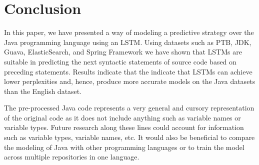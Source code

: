 \documentclass[runningheads,a4paper]{llncs}
\begin{document}

\section{Conclusion}

In this paper, we have presented a way of modeling a predictive strategy
over the Java programming language using an LSTM. Using datasets such as PTB,
JDK, Guava, ElasticSearch, and Spring Framework we have shown that
LSTMs are suitable in predicting the next syntactic statements of source
code based on preceding statements. Results indicate that the indicate
that LSTMs can achieve lower perplexities and, hence, produce more accurate models
on the Java datasets than the English dataset.

The pre-processed Java code represents a very general and cursory
representation of the original code as it does not include anything such
as variable names or variable types. Future research along these lines
could account for information such as variable types, variable names, etc.
It would also be beneficial to compare the modeling of Java with other
programming languages or to train the model across multiple repositories
in one language.








\end{document}
